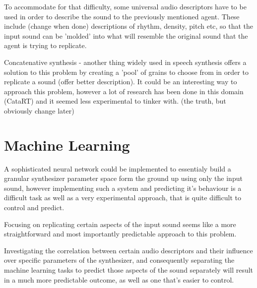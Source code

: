 To accommodate for that difficulty, some universal audio descriptors have to be
used in order to describe the sound to the previously mentioned agent. These
include (change when done) descriptions of rhythm, density, pitch etc, so that
the input sound can be 'molded' into what will resemble the original sound that
the agent is trying to replicate.

Concatenative synthesis - another thing widely used in speech synthesis offers a
solution to this problem by creating a 'pool' of grains to choose from in order
to replicate a sound (offer better description). It could be an interesting way
to approach this problem, however a lot of research has been done in this domain
(CataRT) and it seemed less experimental to tinker with. (the truth, but
obviously change later)

\section{Machine Learning}

A sophisticated neural network could be implemented to essentialy build a
granular synthesizer parameter space form the ground up using only the input
sound, however implementing such a system and predicting it's behaviour is a
difficult task as well as a very experimental approach, that is quite difficult
to control and predict.

Focusing on replicating certain aspects of the input sound seems like a more
straightforward and most importantly predictable approach to this problem.

Investigating the correlation between certain audio descriptors and their
influence over specific parameters of the synthesizer, and consequently
separating the machine learning tasks to predict those aspects of the sound
separately will result in a much more predictable outcome, as well as one that's
easier to control.
